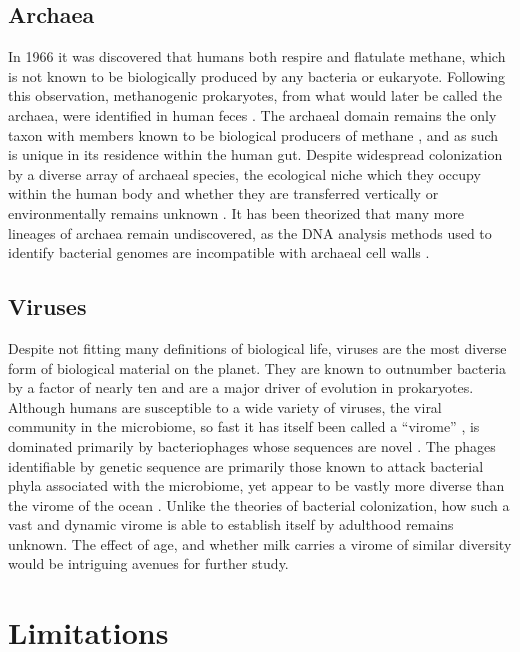 \documentclass[american]{../../../coursework}
\begin{document}
\subsection{Archaea}

In 1966 it was discovered that humans both respire and flatulate methane,
which is not known to be biologically produced by any bacteria or eukaryote.
Following this observation, methanogenic prokaryotes, from what would later
be called the archaea, were identified in human feces \parencite{Not68}. The
archaeal domain remains the only taxon with members known to be biological
producers of methane \parencite{Tha06}, and as such is unique in its
residence within the human gut. Despite widespread colonization by a diverse
array of archaeal species, the ecological niche which they occupy within the
human body and whether they are transferred vertically or environmentally
remains unknown \parencite{Dri11}. It has been theorized that many more
lineages of archaea remain undiscovered, as the DNA analysis methods used to
identify bacterial genomes are incompatible with archaeal cell walls
\parencite{Hor15}.

\subsection{Viruses}

Despite not fitting many definitions of biological life, viruses are the most
diverse form of biological material on the planet. They are known to
outnumber bacteria by a factor of nearly ten \parencite{Ore97} and are a
major driver of evolution in prokaryotes. Although humans are susceptible to
a wide variety of viruses, the viral community in the microbiome, so fast it
has itself been called a ``virome'' \parencite{Wyl12}, is dominated primarily
by bacteriophages whose sequences are novel \parencite{Dut14}. The phages
identifiable by genetic sequence are primarily those known to attack
bacterial phyla associated with the microbiome, yet appear to be vastly more
diverse than the virome of the ocean \parencite{Wal14}. Unlike the theories
of bacterial colonization, how such a vast and dynamic virome is able to
establish itself by adulthood remains unknown. The effect of age, and whether
milk carries a virome of similar diversity would be intriguing avenues for
further study.

\section{Limitations}
\end{document}
